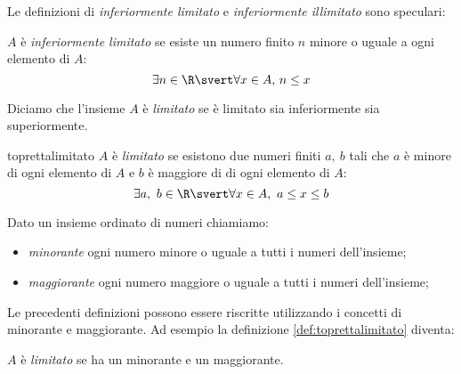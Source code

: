 \vspace{.5em}
Le definizioni di \emph{inferiormente limitato} e \emph{inferiormente 
illimitato} sono speculari:

\begin{newdef}{}{}
\(A\) è \emph{inferiormente limitato} se esiste un numero finito \(n\) 
minore o uguale a ogni elemento di \(A\):
\[\exists n \in \R \svert \forall x \in A,\, n \leq x\]
\end{newdef}


\vspace{.5em}
Diciamo che l'insieme \(A\) è \emph{limitato} se è limitato sia inferiormente 
sia superiormente.

\begin{newdef}{}{toprettalimitato}
\(A\) è \emph{limitato} se esistono due numeri finiti \(a,~b\) tali 
che \(a\) è minore di ogni elemento di \(A\) e \(b\) è maggiore di di ogni 
elemento di \(A\):
\[\exists a,~b \in \R \svert \forall x \in A,~ a \leq x \leq b\]
\end{newdef}

\begin{newdef}{}{}
Dato un insieme ordinato di numeri chiamiamo:
\begin{itemize} [nosep]
\item \emph{minorante} ogni numero minore o uguale a tutti i numeri 
dell'insieme;
\item \emph{maggiorante} ogni numero maggiore o uguale a tutti i numeri 
dell'insieme;
\end{itemize}
\end{newdef}

Le precedenti definizioni possono essere riscritte utilizzando i concetti 
di minorante e maggiorante. 
Ad esempio la definizione \ref{def:toprettalimitato} diventa:

\begin{newdef}{}{}
\(A\) è \emph{limitato} se ha un minorante e un maggiorante.
\end{newdef}

